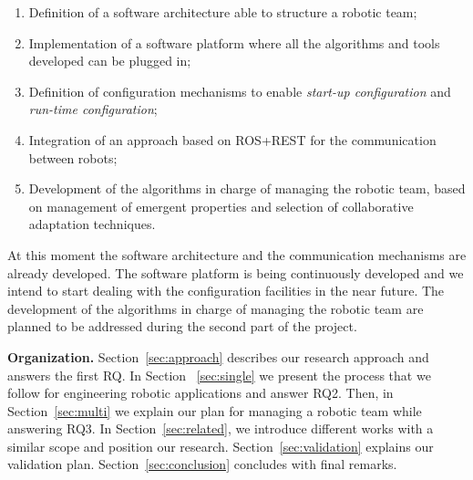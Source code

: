 \begin{enumerate}
\item Definition of a software architecture able to structure a robotic team;
\item Implementation of a software platform where all the algorithms and tools developed can be plugged in;
\item Definition of configuration mechanisms to enable \emph{start-up configuration} and \emph{run-time configuration};
\item Integration of an approach based on ROS+REST for the communication between robots;
\item Development of the algorithms in charge of managing the robotic team, based on management of emergent properties and selection of collaborative adaptation techniques.
\end{enumerate}

At this moment the software architecture and the communication mechanisms are already developed.
The software platform is being continuously developed and we intend to start dealing with the configuration facilities in the near future.
The development of the algorithms in charge of managing the robotic team are planned to be addressed during the second part of the project.

\textbf{Organization.} 
Section~\ref{sec:approach} describes our research approach and answers the first RQ. %
In Section ~\ref{sec:single} we present the process that we follow for engineering robotic applications and answer RQ2.
Then, in Section~\ref{sec:multi} we explain our plan for managing a robotic team while answering RQ3.
In Section~\ref{sec:related}, we introduce different works with a similar scope and position our research.
Section~\ref{sec:validation} explains our validation plan.
Section~\ref{sec:conclusion} concludes with final remarks.